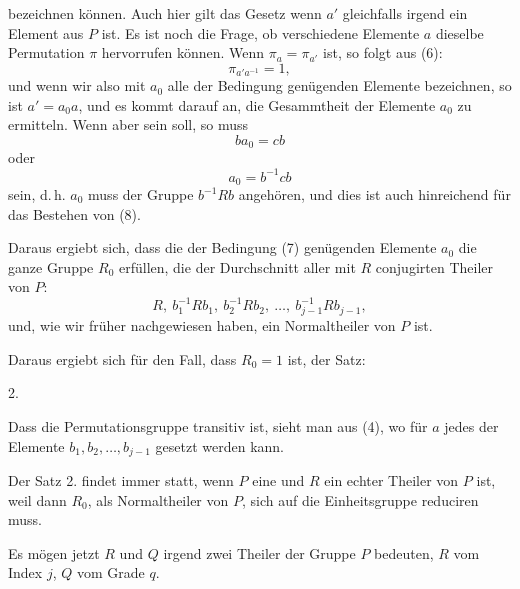 bezeichnen können. Auch hier gilt das Gesetz
wenn $a'$ gleichfalls irgend ein Element aus $P$ ist. Es ist noch
die Frage, ob verschiedene Elemente $a$ dieselbe Permutation $\pi$
hervorrufen können. Wenn $\pi_a = \pi_{a'}$ ist, so folgt aus (6):
\[
\pi_{a'a^{-1}} = 1,
\]
und wenn wir also mit $a_0$ alle der Bedingung
genügenden Elemente bezeichnen, so ist $a' = a_0 a$, und es kommt
darauf an, die Gesammtheit der Elemente $a_0$ zu ermitteln. Wenn
aber
sein soll, so muss
\[
ba_0 = cb
\]
oder
\[
a_0 = b^{-1}cb
\]
sein, d.\,h. $a_0$ muss der Gruppe $b^{-1}Rb$ angehören, und dies ist
auch hinreichend für das Bestehen von (8).

Daraus ergiebt sich, dass die der Bedingung (7) genügenden
Elemente $a_0$ die ganze Gruppe $R_0$ erfüllen, die der Durchschnitt
aller mit $R$ conjugirten Theiler von $P$:
\[
R,\ b_1^{-1}Rb_1,\ b_2^{-1}Rb_2,\ \ldots,\ b_{j-1}^{-1}Rb_{j-1},
\]
und, wie wir früher nachgewiesen haben, ein Normaltheiler
von $P$ ist.

Daraus ergiebt sich für den Fall, dass $R_0 = 1$ ist, der Satz:

2.\ 

Dass die Permutationsgruppe transitiv ist, sieht man aus (4),
wo für $a$ jedes der Elemente $b_1, b_2, \ldots, b_{j-1}$ gesetzt werden kann.

Der Satz 2. findet immer statt, wenn $P$ eine 
und $R$ ein echter Theiler von $P$ ist, weil dann $R_0$, als Normaltheiler von $P$, sich auf die Einheitsgruppe reduciren muss\footnotemark.

Es mögen jetzt $R$ und $Q$ irgend zwei Theiler der Gruppe $P$
bedeuten, $R$ vom Index $j$, $Q$ vom Grade $q$.
